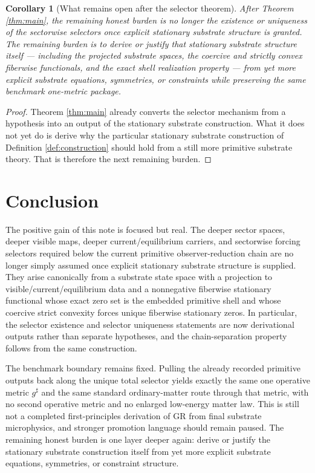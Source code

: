 \documentclass[11pt]{article}
\newcommand{\CompletedMetric}{g^{\sharp}}
\newtheorem{corollary}{Corollary}
\begin{document}
\begin{corollary}[What remains open after the selector theorem]
\label{cor:next}
After Theorem \ref{thm:main}, the remaining honest burden is no longer the existence or uniqueness of the sectorwise selectors once explicit stationary substrate structure is granted. The remaining burden is to derive or justify that stationary substrate structure itself --- including the projected substrate spaces, the coercive and strictly convex fiberwise functionals, and the exact shell realization property --- from yet more explicit substrate equations, symmetries, or constraints while preserving the same benchmark one-metric package.
\end{corollary}

\begin{proof}
Theorem \ref{thm:main} already converts the selector mechanism from a hypothesis into an output of the stationary substrate construction. What it does not yet do is derive why the particular stationary substrate construction of Definition \ref{def:construction} should hold from a still more primitive substrate theory. That is therefore the next remaining burden.
\end{proof}

\section{Conclusion}

The positive gain of this note is focused but real. The deeper sector spaces, deeper visible maps, deeper current/equilibrium carriers, and sectorwise forcing selectors required below the current primitive observer-reduction chain are no longer simply assumed once explicit stationary substrate structure is supplied. They arise canonically from a substrate state space with a projection to visible/current/equilibrium data and a nonnegative fiberwise stationary functional whose exact zero set is the embedded primitive shell and whose coercive strict convexity forces unique fiberwise stationary zeros. In particular, the selector existence and selector uniqueness statements are now derivational outputs rather than separate hypotheses, and the chain-separation property follows from the same construction.

The benchmark boundary remains fixed. Pulling the already recorded primitive outputs back along the unique total selector yields exactly the same one operative metric \(\CompletedMetric\) and the same standard ordinary-matter route through that metric, with no second operative metric and no enlarged low-energy matter law. This is still not a completed first-principles derivation of GR from final substrate microphysics, and stronger promotion language should remain paused. The remaining honest burden is one layer deeper again: derive or justify the stationary substrate construction itself from yet more explicit substrate equations, symmetries, or constraint structure.
\end{document}
